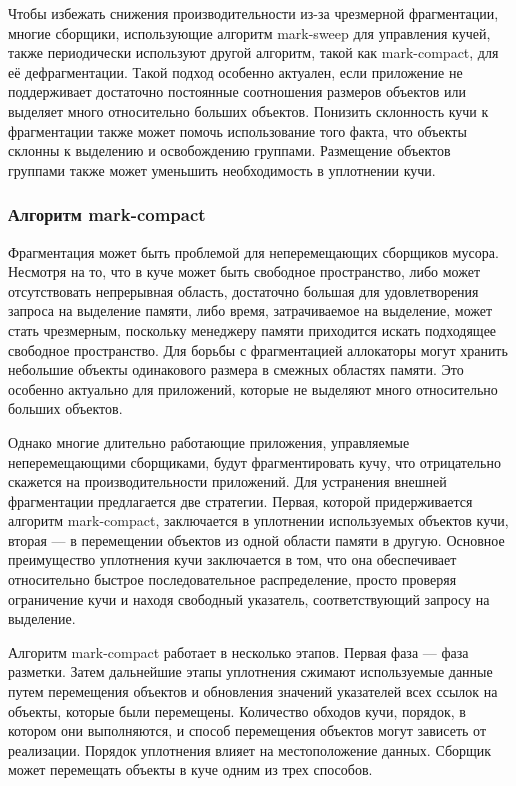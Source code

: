 Чтобы избежать снижения производительности из-за чрезмерной фрагментации, многие сборщики, использующие алгоритм mark-sweep для управления кучей, также периодически используют другой алгоритм, такой как mark-compact, для её дефрагментации. Такой подход особенно актуален, если приложение не поддерживает достаточно постоянные соотношения размеров объектов или выделяет много относительно больших объектов. Понизить склонность кучи к фрагментации также может помочь использование того факта, что объекты склонны к выделению и освобождению группами. Размещение объектов группами также может уменьшить необходимость в уплотнении кучи. \cite{handbook}



\subsubsection{Алгоритм mark-compact}
\label{mark-compact}

Фрагментация может быть проблемой для неперемещающих сборщиков мусора. Несмотря на то, что в куче может быть свободное пространство, либо может отсутствовать непрерывная область, достаточно большая для удовлетворения запроса на выделение памяти, либо время, затрачиваемое на выделение, может стать чрезмерным, поскольку менеджеру памяти приходится искать подходящее свободное пространство. Для борьбы с фрагментацией аллокаторы могут хранить небольшие объекты одинакового размера в смежных областях памяти. Это особенно актуально для приложений, которые не выделяют много относительно больших объектов.  \cite{handbook}

Однако многие длительно работающие приложения, управляемые неперемещающими сборщиками, будут фрагментировать кучу, что отрицательно скажется на производительности приложений. Для устранения внешней фрагментации предлагается две стратегии. Первая, которой придерживается алгоритм mark-compact, заключается в уплотнении используемых объектов кучи, вторая --- в перемещении объектов из одной области памяти в другую. Основное преимущество уплотнения кучи заключается в том, что она обеспечивает относительно быстрое последовательное распределение, просто проверяя ограничение кучи и находя свободный указатель, соответствующий запросу на выделение. \cite{handbook}

Алгоритм mark-compact работает в несколько этапов. Первая фаза --- фаза разметки. Затем дальнейшие
этапы уплотнения сжимают используемые данные путем перемещения объектов и обновления значений указателей всех ссылок на объекты, которые были перемещены. Количество обходов кучи, порядок, в котором они выполняются, и способ перемещения объектов могут зависеть от реализации. Порядок уплотнения влияет на местоположение данных. Сборщик может перемещать объекты в куче одним из трех способов. \cite{handbook}

